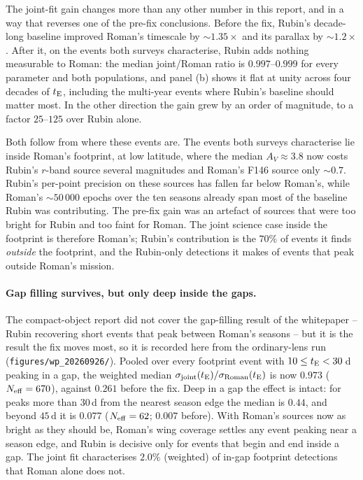 \documentclass[english,10pt,a4paper]{article}
\newcommand{\tE}{t_{\rm E}}
\newcommand{\Neff}{N_{\rm eff}}
\begin{document}
The joint-fit gain changes more than any other number in this report, and in a way that reverses
one of the pre-fix conclusions. Before the fix, Rubin's decade-long baseline improved Roman's
timescale by $\sim\!1.35\times$ and its parallax by $\sim\!1.2\times$. After it, on the events both
surveys characterise, Rubin adds nothing measurable to Roman: the median joint/Roman ratio is
$0.997$--$0.999$ for every parameter and both populations, and panel (b) shows it flat at unity
across four decades of $\tE$, including the multi-year events where Rubin's baseline should matter
most. In the other direction the gain grew by an order of magnitude, to a factor $25$--$125$
over Rubin alone.

Both follow from where these events are. The events both surveys characterise lie inside Roman's
footprint, at low latitude, where the median $A_V\approx3.8$ now costs Rubin's $r$-band source
several magnitudes and Roman's F146 source only $\sim\!0.7$. Rubin's per-point precision on these
sources has fallen far below Roman's, while Roman's $\sim\!50\,000$ epochs over the ten seasons
already span most of the baseline Rubin was contributing. The pre-fix gain was an artefact of
sources that were too bright for Rubin and too faint for Roman. The joint science case inside the
footprint is therefore Roman's; Rubin's contribution is the $70\%$ of events it finds \emph{outside}
the footprint, and the Rubin-only detections it makes of events that peak outside Roman's
mission.

\paragraph{Gap filling survives, but only deep inside the gaps.} The compact-object report did not
cover the gap-filling result of the whitepaper -- Rubin recovering short events that peak between
Roman's seasons -- but it is the result the fix moves most, so it is recorded here from the
ordinary-lens run (\texttt{figures/wp\_20260926/}). Pooled over every footprint event with
$10\le\tE<30$\,d peaking in a gap, the weighted median $\sigma_{\rm joint}(\tE)/\sigma_{\rm Roman}(\tE)$
is now $0.973$ ($\Neff=670$), against $0.261$ before the fix. Deep in a gap the effect is intact:
for peaks more than $30$\,d from the nearest season edge the median is $0.44$, and beyond $45$\,d
it is $0.077$ ($\Neff=62$; $0.007$ before). With Roman's sources now as bright as they should be,
Roman's wing coverage settles any event peaking near a season edge, and Rubin is decisive only for
events that begin and end inside a gap. The joint fit characterises $2.0\%$ (weighted) of in-gap
footprint detections that Roman alone does not.
\end{document}
